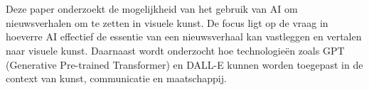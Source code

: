 
%
%
%
%
%

%



\chapter*{}

Deze paper onderzoekt de mogelijkheid van het gebruik van AI om nieuwsverhalen om te zetten in visuele kunst. De focus ligt op de vraag in hoeverre AI effectief de essentie van een nieuwsverhaal kan vastleggen en vertalen naar visuele kunst. Daarnaast wordt onderzocht hoe technologieën zoals GPT (Generative Pre-trained Transformer) en DALL-E kunnen worden toegepast in de context van kunst, communicatie en maatschappij.\\

